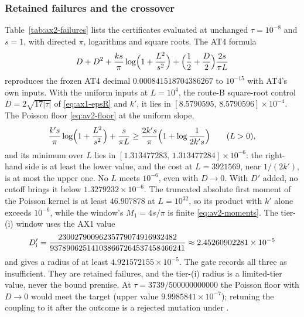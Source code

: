 \subsubsection{Retained failures and the crossover}
\label{sec:ax2-failures}
Table~\ref{tab:ax2-failures} lists the certificates evaluated at unchanged
$\tau=10^{-8}$ and $s=1$, with directed $\pi$, logarithms and square roots.
The AT4 formula
\begin{equation}
 D+D^2+\frac{ks}{\pi}\log\Bigl(1+\frac{L^2}{s^2}\Bigr)
 +\Bigl(\frac12+\frac D2\Bigr)\frac{2s}{\pi L}
 \label{eq:ax2-at4}
\end{equation}
reproduces the frozen AT4 decimal $0.000841518704386267$ to $10^{-15}$ with
AT4's own inputs. With the uniform inputs at $L=10^4$, the route-B
square-root control $D=2\sqrt{17|\tau|}$ of \eqref{eq:ax1-epsR} and $k'$, it
lies in $[8.5790595,\,8.5790596]\times10^{-4}$. The Poisson floor
\eqref{eq:av2-floor} at the uniform slope,
\begin{equation}
 \frac{k's}{\pi}\log\Bigl(1+\frac{L^2}{s^2}\Bigr)+\frac s{\pi L}
 \ge\frac{2k's}{\pi}\Bigl(1+\log\frac1{2k's}\Bigr)\qquad(L>0),
 \label{eq:ax2-floor}
\end{equation}
and its minimum over $L$ lies in $[1.313477283,\,1.313477284]\times10^{-6}$:
the right-hand side is at least the lower value, and the cost at
$L=3921569$, near $1/(2k')$, is at most the upper one. No $L$ meets
$10^{-6}$, even with $D\to0$. With $D'$ added, no cutoff brings it below
$1.3279232\times10^{-6}$. The truncated absolute first moment of the Poisson
kernel is at least $46.907878$ at $L=10^{32}$, so its product with $k'$ alone
exceeds $10^{-6}$, while the window's $M_1=4s/\pi$ is finite
\eqref{eq:av2-moments}. The tier-(i) window uses the AX1 value
\[
 D'_{\rm i}=\frac{23002790096235779074916932482}{937890625141038667264537458466241}
 \approx2.45260902281\times10^{-5}
\]
and gives a radius of at least $4.921572155\times10^{-5}$. The gate records
all three as insufficient. They are retained failures, and the tier-(i)
radius is a limited-tier value, never the bound premise. At
$\tau=3739/500000000000$ the Poisson floor with $D\to0$ would meet the target
(upper value $9.9985841\times10^{-7}$); retuning the coupling to it after the
outcome is a rejected mutation under .

